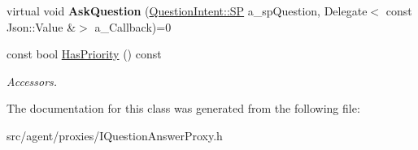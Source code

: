 \begin{DoxyCompactItemize}
virtual void {\bfseries Ask\+Question} (\hyperlink{class_question_intent_a250dceb08e1342574a0aca4fe40a7121}{Question\+Intent\+::\+SP} a\+\_\+sp\+Question, Delegate$<$ const Json\+::\+Value \&$>$ a\+\_\+\+Callback)=0
\item 
\mbox{\label{class_i_question_answer_proxy_af2720967ba607fe2a628a4401e18d49d}} 
const bool \hyperlink{class_i_question_answer_proxy_af2720967ba607fe2a628a4401e18d49d}{Has\+Priority} () const
\begin{DoxyCompactList}\small\item\em Accessors. \end{DoxyCompactList}\end{DoxyCompactItemize}


The documentation for this class was generated from the following file\+:\begin{DoxyCompactItemize}
\item 
src/agent/proxies/I\+Question\+Answer\+Proxy.\+h\end{DoxyCompactItemize}
